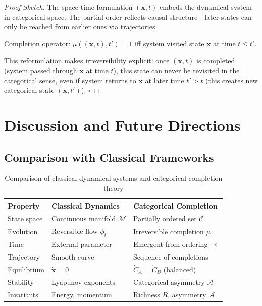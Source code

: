 \documentclass[12pt,a4paper]{article}
\begin{document}
\begin{proof}[Proof Sketch]
The space-time formulation $(\mathbf{x}, t)$ embeds the dynamical system in categorical space. The partial order reflects causal structure—later states can only be reached from earlier ones via trajectories.

Completion operator: $\mu((\mathbf{x}, t), t') = 1$ iff system visited state $\mathbf{x}$ at time $t \leq t'$.

This reformulation makes irreversibility explicit: once $(\mathbf{x}, t)$ is completed (system passed through $\mathbf{x}$ at time $t$), this state can never be revisited in the categorical sense, even if system returns to $\mathbf{x}$ at later time $t' > t$ (this creates new categorical state $(\mathbf{x}, t')$). $\square$
\end{proof}

\section{Discussion and Future Directions}

\subsection{Comparison with Classical Frameworks}

\begin{table}[H]
\centering
\begin{tabular}{lll}
\hline
\textbf{Property} & \textbf{Classical Dynamics} & \textbf{Categorical Completion} \\
\hline
State space & Continuous manifold $\mathcal{M}$ & Partially ordered set $\mathcal{C}$ \\
Evolution & Reversible flow $\phi_t$ & Irreversible completion $\mu$ \\
Time & External parameter & Emergent from ordering $\prec$ \\
Trajectory & Smooth curve & Sequence of completions \\
Equilibrium & $\dot{\mathbf{x}} = 0$ & $\dot{C}_A = \dot{C}_B$ (balanced) \\
Stability & Lyapunov exponents & Categorical asymmetry $\mathcal{A}$ \\
Invariants & Energy, momentum & Richness $R$, asymmetry $\mathcal{A}$ \\
\hline
\end{tabular}
\caption{Comparison of classical dynamical systems and categorical completion theory}
\label{tab:comparison}
\end{table}
\end{document}
